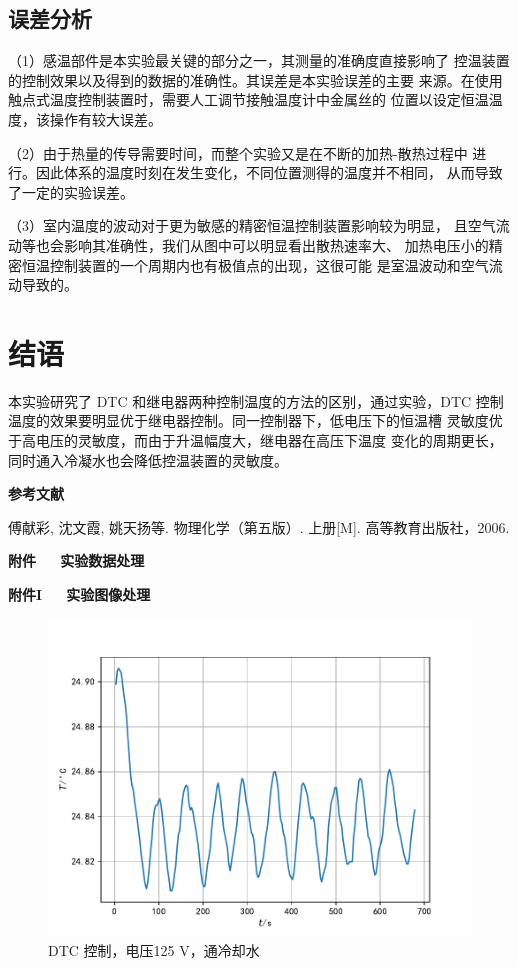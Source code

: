 \documentclass[12pt]{ctexart}
\numberwithin{equation}{section}
\begin{document}
\subsection{误差分析}

（1）感温部件是本实验最关键的部分之一，其测量的准确度直接影响了
控温装置的控制效果以及得到的数据的准确性。其误差是本实验误差的主要
来源。在使用触点式温度控制装置时，需要人工调节接触温度计中金属丝的
位置以设定恒温温度，该操作有较大误差。

（2）由于热量的传导需要时间，而整个实验又是在不断的加热-散热过程中
进行。因此体系的温度时刻在发生变化，不同位置测得的温度并不相同，
从而导致了一定的实验误差。

（3）室内温度的波动对于更为敏感的精密恒温控制装置影响较为明显，
且空气流动等也会影响其准确性，我们从图中可以明显看出散热速率大、
加热电压小的精密恒温控制装置的一个周期内也有极值点的出现，这很可能
是室温波动和空气流动导致的。

\section{结语}

本实验研究了 DTC 和继电器两种控制温度的方法的区别，通过实验，DTC
控制温度的效果要明显优于继电器控制。同一控制器下，低电压下的恒温槽
灵敏度优于高电压的灵敏度，而由于升温幅度大，继电器在高压下温度
变化的周期更长，同时通入冷凝水也会降低控温装置的灵敏度。

\begin{center}
    \Large\bfseries{参考文献}
\end{center}
\noindent
[1] 傅献彩, 沈文霞, 姚天扬等. 物理化学（第五版）. 上册[M].
高等教育出版社，2006.

\newpage

\begin{center}
    \LARGE\bfseries{附件~~~实验数据处理}
\end{center}
\begin{center}
    \Large\bfseries{附件I~~~实验图像处理}
\end{center}

\begin{figure}[!h]
    \centering
    \includegraphics[scale=0.68]{Figure_1.pdf}
    \caption{DTC 控制，电压125 V，通冷却水}
\end{figure}
\end{document}
